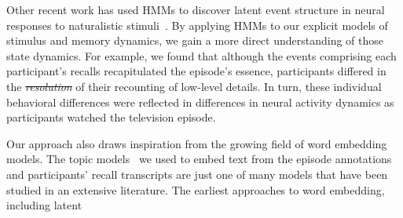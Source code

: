 \documentclass[10pt]{article}
\renewcommand{\includegraphics}[2][]{} %
\providecommand{\DIFaddtex}[1]{{\protect\color{blue}\uwave{#1}}} %
\providecommand{\DIFdeltex}[1]{{\protect\color{red}\sout{#1}}}                      %
\providecommand{\DIFaddbegin}{} %
\providecommand{\DIFaddend}{} %
\providecommand{\DIFdelbegin}{} %
\providecommand{\DIFdelend}{} %
\providecommand{\DIFadd}[1]{\texorpdfstring{\DIFaddtex{#1}}{#1}} %
\providecommand{\DIFdel}[1]{\texorpdfstring{\DIFdeltex{#1}}{}} %
\newcommand{\DIFscaledelfig}{0.5}
\newlength{\DIFdelgraphicswidth} %
\newlength{\DIFdelgraphicsheight} %
\newcommand{\DIFaddincludegraphics}[2][]{{\color{blue}\fbox{\DIFOincludegraphics[#1]{#2}}}} %
\newcommand{\DIFdelincludegraphics}[2][]{%
\sbox{\DIFdelgraphicsbox}{\DIFOincludegraphics[#1]{#2}}%
\settoboxwidth{\DIFdelgraphicswidth}{\DIFdelgraphicsbox} %
\settoboxtotalheight{\DIFdelgraphicsheight}{\DIFdelgraphicsbox} %
\scalebox{\DIFscaledelfig}{%
\parbox[b]{\DIFdelgraphicswidth}{\usebox{\DIFdelgraphicsbox}\\[-\baselineskip] \rule{\DIFdelgraphicswidth}{0em}}\llap{\resizebox{\DIFdelgraphicswidth}{\DIFdelgraphicsheight}{%
\setlength{\unitlength}{\DIFdelgraphicswidth}%
\begin{picture}(1,1)%
\thicklines\linethickness{2pt} %
{\color[rgb]{1,0,0}\put(0,0){\framebox(1,1){}}}%
{\color[rgb]{1,0,0}\put(0,0){\line( 1,1){1}}}%
{\color[rgb]{1,0,0}\put(0,1){\line(1,-1){1}}}%
\end{picture}%
}\hspace*{3pt}}} %
} %
\DeclareRobustCommand{\DIFaddbegin}{\DIFOaddbegin \let\includegraphics\DIFaddincludegraphics} %
\DeclareRobustCommand{\DIFaddend}{\DIFOaddend \let\includegraphics\DIFOincludegraphics} %
\DeclareRobustCommand{\DIFdelbegin}{\DIFOdelbegin \let\includegraphics\DIFdelincludegraphics} %
\DeclareRobustCommand{\DIFdelend}{\DIFOaddend \let\includegraphics\DIFOincludegraphics} %
\begin{document}
Other recent work has used HMMs to discover latent event structure in neural responses to naturalistic stimuli~\citep{BaldEtal17}.  By applying HMMs to our explicit models of stimulus and memory dynamics, we gain a more direct understanding of those state dynamics.  For example, we found that although the events comprising each participant's recalls recapitulated the episode's essence, participants differed in the \DIFdelbegin \textit{\DIFdel{resolution}} %
\DIFdelend \DIFaddbegin \DIFadd{resolution }\DIFaddend of their recounting of low-level details.  In turn, these individual behavioral differences were reflected in differences in neural activity dynamics as participants watched the television episode.

Our approach also draws inspiration from the growing field of word embedding models.  The topic models~\citep{BleiEtal03} we used to embed text from the episode annotations and participants' recall transcripts are just one of many models that have been studied in an extensive literature.  The earliest approaches to word embedding, including latent
\end{document}
